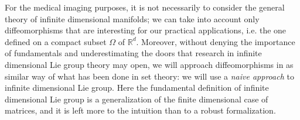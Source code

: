 For the medical imaging purposes, it is not necessarily to consider the general theory of infinite dimensional manifolds; we can take into account only diffeomorphisms that are interesting for our practical applications, i.e. the one defined on a compact subset $\Omega$ of $\mathbb{R}^d$. Moreover, without denying the importance of fundamentals and underestimating the doors that research in infinite dimensional Lie group theory may open, we will approach diffeomorphisms in as similar way of what has been done in set theory: we will use a \emph{naive approach} to infinite dimensional Lie group. 
Here the fundamental definition of infinite dimensional Lie group is a generalization of the finite dimensional case of matrices, and it is left more to the intuition than to a robust formalization. 




